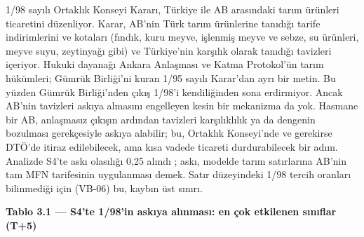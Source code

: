 1/98 sayılı Ortaklık Konseyi Kararı, Türkiye ile AB arasındaki tarım ürünleri ticaretini düzenliyor. Karar, AB'nin Türk tarım ürünlerine tanıdığı tarife indirimlerini ve kotaları (fındık, kuru meyve, işlenmiş meyve ve sebze, su ürünleri, meyve suyu, zeytinyağı gibi) ve Türkiye'nin karşılık olarak tanıdığı tavizleri içeriyor. Hukuki dayanağı Ankara Anlaşması ve Katma Protokol'ün tarım hükümleri; Gümrük Birliği'ni kuran 1/95 sayılı Karar'dan ayrı bir metin. Bu yüzden Gümrük Birliği'nden çıkış 1/98'i kendiliğinden sona erdirmiyor. Ancak AB'nin tavizleri askıya almasını engelleyen kesin bir mekanizma da yok. Hasmane bir AB, anlaşmasız çıkışın ardından tavizleri karşılıklılık ya da dengenin bozulması gerekçesiyle askıya alabilir; bu, Ortaklık Konseyi'nde ve gerekirse DTÖ'de itiraz edilebilecek, ama kısa vadede ticareti durdurabilecek bir adım. Analizde S4'te askı olasılığı 0,25 alındı \etiketH{}; askı, modelde tarım satırlarına AB'nin tam MFN tarifesinin uygulanması demek. Satır düzeyindeki 1/98 tercih oranları bilinmediği için (VB-06) bu, kaybın üst sınırı.


\textbf{Tablo 3.1 --- S4'te 1/98'in askıya alınması: en çok etkilenen sınıflar (T+5)}

\nopagebreak[4]

\begingroup\gbtablo\footnotesize

